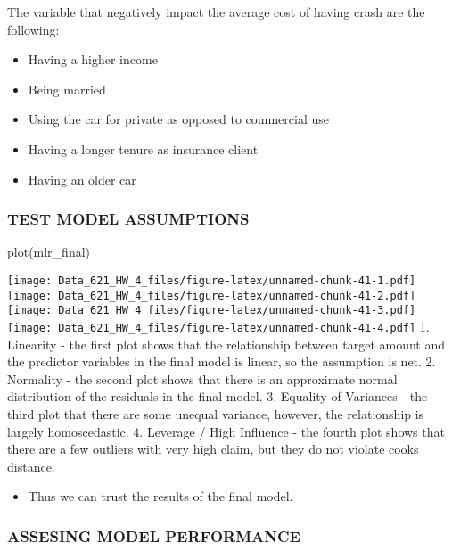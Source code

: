\documentclass[
]{article}
\newenvironment{Shaded}{\begin{snugshade}}{\end{snugshade}}
\newcommand{\FunctionTok}[1]{\textcolor[rgb]{0.00,0.00,0.00}{#1}}
\newcommand{\NormalTok}[1]{#1}
\providecommand{\tightlist}{%
  \setlength{\itemsep}{0pt}\setlength{\parskip}{0pt}}
\begin{document}
The variable that negatively impact the average cost of having crash are
the following:

\begin{itemize}
\tightlist
\item
  Having a higher income
\item
  Being married
\item
  Using the car for private as opposed to commercial use
\item
  Having a longer tenure as insurance client
\item
  Having an older car
\end{itemize}

\hypertarget{test-model-assumptions}{%
\subsubsection{TEST MODEL ASSUMPTIONS}\label{test-model-assumptions}}

\begin{Shaded}
\begin{Highlighting}[]
\FunctionTok{plot}\NormalTok{(mlr\_final)}
\end{Highlighting}
\end{Shaded}

\texttt{[image: Data\_621\_HW\_4\_files/figure-latex/unnamed-chunk-41-1.pdf]}
\texttt{[image: Data\_621\_HW\_4\_files/figure-latex/unnamed-chunk-41-2.pdf]}
\texttt{[image: Data\_621\_HW\_4\_files/figure-latex/unnamed-chunk-41-3.pdf]}
\texttt{[image: Data\_621\_HW\_4\_files/figure-latex/unnamed-chunk-41-4.pdf]}
1. Linearity - the first plot shows that the relationship between target
amount and the predictor variables in the final model is linear, so the
assumption is net. 2. Normality - the second plot shows that there is an
approximate normal distribution of the residuals in the final model. 3.
Equality of Variances - the third plot that there are some unequal
variance, however, the relationship is largely homoscedastic. 4.
Leverage / High Influence - the fourth plot shows that there are a few
outliers with very high claim, but they do not violate cooks distance.

\begin{itemize}
\tightlist
\item
  Thus we can trust the results of the final model.
\end{itemize}

\hypertarget{assesing-model-performance-1}{%
\subsubsection{ASSESING MODEL
PERFORMANCE}\label{assesing-model-performance-1}}
\end{document}
